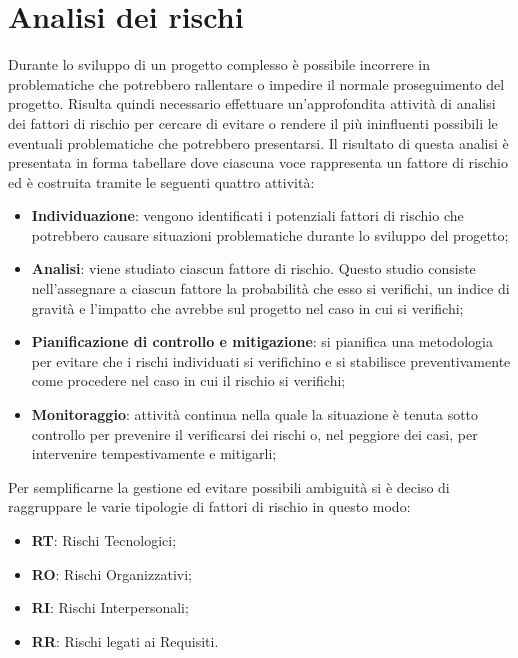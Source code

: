 \section{Analisi dei rischi}
Durante lo sviluppo di un progetto complesso è possibile incorrere in problematiche che potrebbero rallentare o impedire il normale proseguimento del progetto. Risulta quindi necessario effettuare un'approfondita attività di analisi dei fattori di rischio per cercare di evitare o rendere il più ininfluenti possibili le eventuali problematiche che potrebbero presentarsi.
Il risultato di questa analisi è presentata in forma tabellare dove ciascuna voce rappresenta un fattore di rischio ed è costruita tramite le seguenti quattro attività:
\begin{itemize}
	\item \textbf{Individuazione}: vengono identificati i potenziali fattori di rischio che potrebbero causare situazioni problematiche durante lo sviluppo del progetto;
	\item \textbf{Analisi}: viene studiato ciascun fattore di rischio. Questo studio consiste nell'assegnare a ciascun fattore la probabilità che esso si verifichi, un indice di gravità e l'impatto che avrebbe sul progetto nel caso in cui si verifichi;
	\item \textbf{Pianificazione di controllo e mitigazione}: si pianifica una metodologia per evitare che i rischi individuati si verifichino e si stabilisce preventivamente come procedere nel caso in cui il rischio si verifichi;
	\item \textbf{Monitoraggio}: attività continua nella quale la situazione è tenuta sotto controllo per prevenire il verificarsi dei rischi o, nel peggiore dei casi, per intervenire tempestivamente e mitigarli;
\end{itemize}

Per semplificarne la gestione ed evitare possibili ambiguità si è deciso di raggruppare le varie tipologie di fattori di rischio in questo modo:
\begin{itemize}
	\item \textbf{RT}: Rischi Tecnologici;
	\item \textbf{RO}: Rischi Organizzativi;
	\item \textbf{RI}: Rischi Interpersonali;
	\item \textbf{RR}: Rischi legati ai Requisiti.
\end{itemize}


